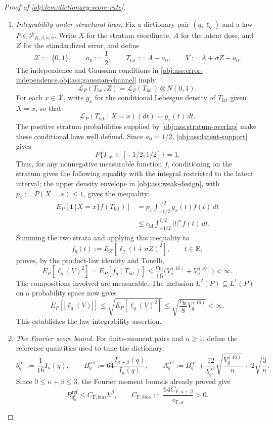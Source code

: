 \documentclass[11pt]{article}
\begin{document}
\begin{proof}[Proof of \cref{obj:lem:dictionary-score-rate}]
\begin{enumerate}
\item \emph{Integrability under structural laws.}
Fix a dictionary pair \((q,\ell_q)\) and a law \(P\in\mathcal P_{K,\beta,\kappa,\sigma}\). Write \(X\) for the stratum coordinate, \(A\) for the latent dose, and \(Z\) for the standardized error, and define
\[
\mathcal X:=\{0,1\},
\qquad
a_0:=\frac12,
\qquad
T_{\mathrm{lat}}:=A-a_0,
\qquad
V:=A+\sigma Z-a_0.
\]
The independence and Gaussian conditions in \cref{obj:ass:error-independence,obj:ass:gaussian-channel} imply
\[
\mathcal L_P(T_{\mathrm{lat}},Z)
=\mathcal L_P(T_{\mathrm{lat}})\otimes N(0,1).
\]
For each \(x\in\mathcal X\), write \(g_x\) for the conditional Lebesgue density of \(T_{\mathrm{lat}}\) given \(X=x\), so that
\[
\mathcal L_P(T_{\mathrm{lat}}\mid X=x)(dt)=g_x(t)\,dt.
\]
The positive stratum probabilities supplied by \cref{obj:ass:stratum-overlap} make these conditional laws well defined. Since \(a_0=1/2\), \cref{obj:ass:latent-support} gives
\[
P\{T_{\mathrm{lat}}\in[-1/2,1/2]\}=1.
\]
Thus, for any nonnegative measurable function \(f\), conditioning on the stratum gives the following equality with the integral restricted to the latent interval; the upper density envelope in \cref{obj:ass:weak-design}, with \(p_x:=P(X=x)\le1\), gives the inequality:
\[
\begin{aligned}
E_P[\mathbf1\{X=x\}f(T_{\mathrm{lat}})]
&=p_x\int_{-1/2}^{1/2}g_x(t)f(t)\,dt\\
&\le c_{\mathrm{hi}}\int_{-1/2}^{1/2}|t|^\kappa f(t)\,dt.
\end{aligned}
\]
Summing the two strata and applying this inequality to
\[
f_q(t):=E_Z[\ell_q(t+\sigma Z)^2],
\qquad t\in\mathbb R,
\]
proves, by the product-law identity and Tonelli,
\[
E_P[\ell_q(V)^2]
=E_P[f_q(T_{\mathrm{lat}})]
\le\frac{c_{\mathrm{hi}}}{16}
\bigl(V_q^{(16)}+V_q^{(16)}\bigr)<\infty.
\]
The compositions involved are measurable. The inclusion \(L^2(P)\subseteq L^1(P)\) on a probability space now gives
\[
E_P[|\ell_q(V)|]
\le\sqrt{E_P[\ell_q(V)^2]}
\le\sqrt{\frac{c_{\mathrm{hi}}}{8}V_q^{(16)}}<\infty.
\]
This establishes the law-integrability assertion.

\item \emph{The Fourier score bound.}
For finite-moment pairs and \(n\ge1\), define the reference quantities used to tune the dictionary:
\[
b_q^{\mathrm{ref}}:=\frac1{16}I_\kappa(q),
\qquad
B_q^{\mathrm{ref}}:=64\frac{I_{\kappa+\beta}(q)}{I_\kappa(q)},
\qquad
A_q^{\mathrm{ref}}:=B_q^{\mathrm{ref}}
+\frac{12}{b_q^{\mathrm{ref}}}\sqrt{\frac{V_q^{(16)}}{n}}
+2\sqrt{\frac3n}.
\]
Since \(0\le\kappa+\beta\le3\), the Fourier moment bounds already proved give
\[
B_{q_h^{\mathrm F}}^{\mathrm{ref}}
\le C_{\mathrm F,bias}h^\beta,
\qquad
C_{\mathrm F,bias}:=
\frac{64C_{\mathrm F,\kappa+\beta}}{c_{\mathrm F,\kappa}}>0.
\]


\end{enumerate}
\end{proof}
\end{document}
